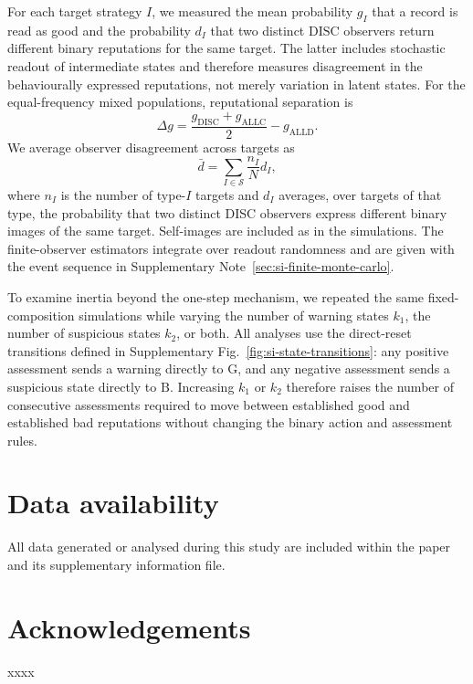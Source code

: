 \documentclass[fleqn,10pt]{wlscirep}
\begin{document}
For each target strategy $I$, we measured the mean probability $g_I$ that a record is read as good and the probability $d_I$ that two distinct $\mathrm{DISC}$ observers return different binary reputations for the same target. The latter includes stochastic readout of intermediate states and therefore measures disagreement in the behaviourally expressed reputations, not merely variation in latent states. For the equal-frequency mixed populations, reputational separation is
\begin{equation}
\Delta g=\frac{g_{\mathrm{DISC}}+g_{\mathrm{ALLC}}}{2}-g_{\mathrm{ALLD}}.
\label{eq:methods-recognition-separation}
\end{equation}
We average observer disagreement across targets as
\begin{equation}
\bar d=\sum_{I\in\mathcal S}\frac{n_I}{N}d_I,
\label{eq:methods-recognition-disagreement}
\end{equation}
where $n_I$ is the number of type-$I$ targets and $d_I$ averages, over targets of that type, the probability that two distinct DISC observers express different binary images of the same target. Self-images are included as in the simulations. The finite-observer estimators integrate over readout randomness and are given with the event sequence in Supplementary Note~\ref{sec:si-finite-monte-carlo}.

To examine inertia beyond the one-step mechanism, we repeated the same fixed-composition simulations while varying the number of warning states $k_1$, the number of suspicious states $k_2$, or both. All analyses use the direct-reset transitions defined in Supplementary Fig.~\ref{fig:si-state-transitions}: any positive assessment sends a warning directly to $\mathrm G$, and any negative assessment sends a suspicious state directly to $\mathrm B$. Increasing $k_1$ or $k_2$ therefore raises the number of consecutive assessments required to move between established good and established bad reputations without changing the binary action and assessment rules.






\section*{Data availability}
All data generated or analysed during this study are included within the paper and its supplementary information file. 

\section*{Acknowledgements}
xxxx
\end{document}
